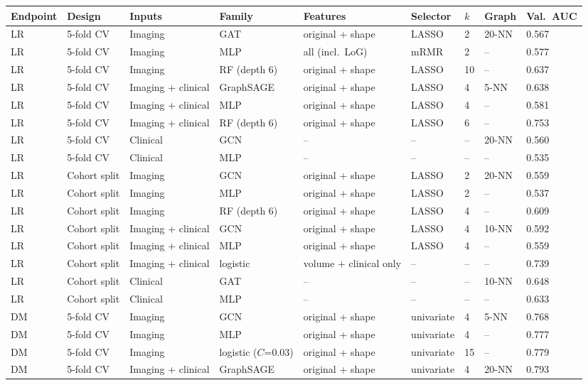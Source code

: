 \begin{tabular}{@{}lllllllll@{}}
\toprule
Endpoint & Design & Inputs & Family & Features & Selector & $k$ & Graph & Val.\ AUC \\
\midrule
LR & 5-fold CV & Imaging & GAT & original + shape & LASSO & 2 & 20-NN & 0.567 \\
LR & 5-fold CV & Imaging & MLP & all (incl.\ LoG) & mRMR & 2 & -- & 0.577 \\
LR & 5-fold CV & Imaging & RF (depth 6) & original + shape & LASSO & 10 & -- & 0.637 \\
LR & 5-fold CV & Imaging + clinical & GraphSAGE & original + shape & LASSO & 4 & 5-NN & 0.638 \\
LR & 5-fold CV & Imaging + clinical & MLP & original + shape & LASSO & 4 & -- & 0.581 \\
LR & 5-fold CV & Imaging + clinical & RF (depth 6) & original + shape & LASSO & 6 & -- & 0.753 \\
LR & 5-fold CV & Clinical & GCN & -- & -- & -- & 20-NN & 0.560 \\
LR & 5-fold CV & Clinical & MLP & -- & -- & -- & -- & 0.535 \\
LR & Cohort split & Imaging & GCN & original + shape & LASSO & 2 & 20-NN & 0.559 \\
LR & Cohort split & Imaging & MLP & original + shape & LASSO & 2 & -- & 0.537 \\
LR & Cohort split & Imaging & RF (depth 6) & original + shape & LASSO & 4 & -- & 0.609 \\
LR & Cohort split & Imaging + clinical & GCN & original + shape & LASSO & 4 & 10-NN & 0.592 \\
LR & Cohort split & Imaging + clinical & MLP & original + shape & LASSO & 4 & -- & 0.559 \\
LR & Cohort split & Imaging + clinical & logistic & volume + clinical only & -- & -- & -- & 0.739 \\
LR & Cohort split & Clinical & GAT & -- & -- & -- & 10-NN & 0.648 \\
LR & Cohort split & Clinical & MLP & -- & -- & -- & -- & 0.633 \\
\midrule
DM & 5-fold CV & Imaging & GCN & original + shape & univariate & 4 & 5-NN & 0.768 \\
DM & 5-fold CV & Imaging & MLP & original + shape & univariate & 4 & -- & 0.777 \\
DM & 5-fold CV & Imaging & logistic ($C$=0.03) & original + shape & univariate & 15 & -- & 0.779 \\
DM & 5-fold CV & Imaging + clinical & GraphSAGE & original + shape & univariate & 4 & 20-NN & 0.793 \\

\end{tabular}
